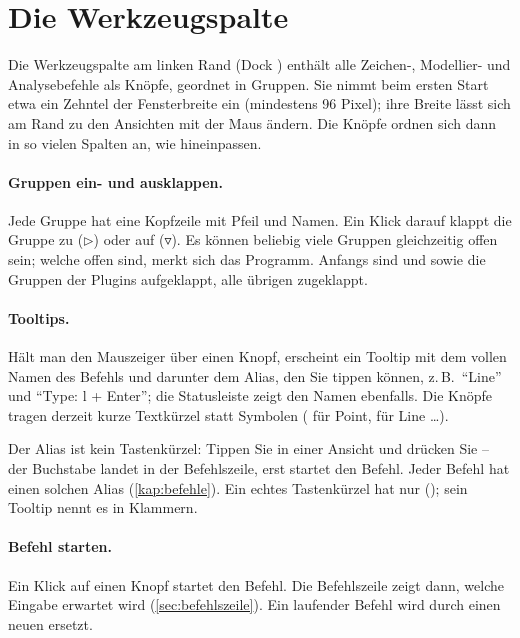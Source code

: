 \section{Die Werkzeugspalte}\label{sec:werkzeugspalte}

Die Werkzeugspalte am linken Rand (Dock ) enthält alle Zeichen-, Modellier- und
Analysebefehle als Knöpfe, geordnet in Gruppen. Sie nimmt beim ersten Start etwa ein Zehntel
der Fensterbreite ein (mindestens 96 Pixel); ihre Breite lässt sich am Rand zu den Ansichten
mit der Maus ändern. Die Knöpfe ordnen sich dann in so vielen Spalten an, wie hineinpassen.

\paragraph{Gruppen ein- und ausklappen.} Jede Gruppe hat eine Kopfzeile mit Pfeil und
Namen. Ein Klick darauf klappt die Gruppe zu ($\triangleright$) oder auf
($\triangledown$). Es können beliebig viele Gruppen gleichzeitig offen sein; welche offen
sind, merkt sich das Programm. Anfangs sind  und  sowie die Gruppen der
Plugins aufgeklappt, alle übrigen zugeklappt.

\paragraph{Tooltips.} Hält man den Mauszeiger über einen Knopf, erscheint ein Tooltip mit dem
vollen Namen des Befehls und darunter dem Alias, den Sie tippen können, z.\,B.\
\enquote{Line} und \enquote{Type: l + Enter}; die Statusleiste zeigt den Namen ebenfalls. Die
Knöpfe tragen derzeit kurze Textkürzel statt Symbolen (\gui{Pt} für Point, \gui{Ln} für Line
\dots).

Der Alias ist kein Tastenkürzel: Tippen Sie in einer Ansicht  und drücken Sie
 -- der Buchstabe landet in der Befehlszeile, erst \keys{Enter} startet den Befehl.
Jeder Befehl hat einen solchen Alias (\autoref{kap:befehle}). Ein echtes Tastenkürzel hat nur
\gui{Delete} (\keys{Entf}); sein Tooltip nennt es in Klammern.

\paragraph{Befehl starten.} Ein Klick auf einen Knopf startet den Befehl. Die Befehlszeile
zeigt dann, welche Eingabe erwartet wird (\autoref{sec:befehlszeile}). Ein laufender Befehl wird
durch einen neuen ersetzt.

